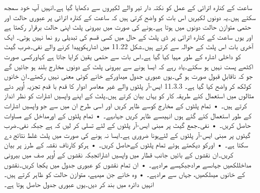 	ساعت کے کنارہ اترائی کے عمل کو نکتہ دار تیر والے لکیروں سے دکھایا گیا ہے۔انہیں آپ خود سمجھ سکتے ہیں۔یہ دونوں لکیریں اس بات کو واضح کرتی ہیں کہ ساعت کے کنارہ اترائی پر عبوری حالت اور حتمی متوازن حالت دونوں میں ہوتا ہے۔ہونے کی صورت میں بیرونی پلٹ اپنی حالت برقرار رکھتا ہے اور یوں ساعت کے کنارہ اترائی پر ڈی پلٹ کے حال میں کسی قسم کی تبدیلی رو نما نہیں ہوتی۔
	ایک آخری بات اس پلٹ کے حوالہ سے کرتے ہیں۔شکل 11.22 میں اشارہکوپیدا کرنے والے نفی۔ضرب گیٹ کو داخلی اشارہ کے طور مہیا کیا گیا ہے۔اس بات سے حتمی یقین کرایا جاتا ہے کہاورکسی صورت اکٹھے پست نہیں ہو سکتے۔یاد رہے کہ ایسا ہونے سے بیرونی پلٹ کے دونوں مخارج بلند ہو جائیں گے جو کہ ناقابلِ قبول صورت ہو گی۔یوں عبوری جدول میںاورکے خانے کوئی معنی نہیں رکھتے۔ان خانوں کولکھ کر واضح کیا گیا ہے۔
11.3.3 ایس-آر پلٹوں والے غیر معاصر ادوار کا قدم با قدم تجزیہ
	اُوپر دئے مثالوں میں استعمال کئے طریقہ کار کو یہاں بیان کرتے ہیں۔پلٹ کے اپنے واپسیں اشارات کو نظر انداز کرتے ہیں۔
    • تمام پلٹوں کے مخارج کوسے ظاہر کریں اور اسی طرح ان میں سے جو واپسیں اشارات کے طور استعمال کئے گئے ہوں انہیںسے ظاہر کریں جہاںہے۔
    • تمام پلٹوں کے اورمداخل کے مساوات حاصل کریں۔
    • نفی۔جمع گیٹ پر مبنی ایس-آر پلٹوں کے لئے تسلی کر لیں کہ ہے جبکہ نفی۔ضرب گیٹوں پر مبنی ایس-آر پلٹوں کے لئےہونا ضروری ہے۔ایسا نہ ہونے کی صورت میں پلٹ غلط نتائج دے سکتا ہے۔
    • اورکو دیکھتے ہوئے تمام پلٹوں کےحاصل کریں۔
    • ہرکو کارناف نقشہ کے طرز پر بیان کریں۔ان نقشوں کے بائیں جانب قطار میں واپسیں اشاراتجبکہ نقشوں کے اُوپر صف میں بیرونی مداخللکھیں جہاںسے مرادجبکہسے مرادہے۔
    • ان تمام نقشوں کو عبوری جدول میں یکجا کریں۔نقشوں کے خانوں میںلکھیں، جہاں سے مرادہے۔
    • وہ خانے جن میںہے، متوازن حالت کو ظاہر کرتے ہیں۔انہیں دائرہ میں بند کر دیں۔یوں عبوری جدول حاصل ہوتا ہے۔


